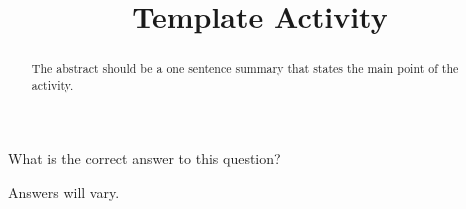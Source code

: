 \documentclass{ximera}
\title{Template Activity}
\begin{document}
\begin{abstract}
  The abstract should be a one sentence summary that states the main point of the activity.
\end{abstract}
\maketitle

\begin{question}
  What is the correct answer to this question?

  \begin{solution}
    \begin{multiple-choice}
    \end{multiple-choice}  
  \end{solution}
\end{question}

\begin{freeResponse}
Answers will vary.
\end{freeResponse}
\end{document}
